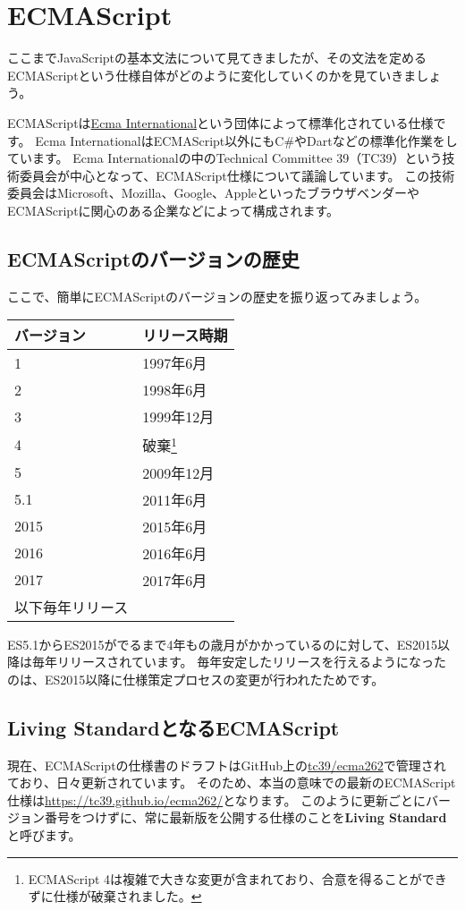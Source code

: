 \hypertarget{ecmascript}{%
\chapter{ECMAScript}\label{ecmascript}}

ここまでJavaScriptの基本文法について見てきましたが、その文法を定めるECMAScriptという仕様自体がどのように変化していくのかを見ていきましょう。

ECMAScriptは\href{http://www.ecma-international.org/}{Ecma
International}という団体によって標準化されている仕様です。 Ecma
InternationalはECMAScript以外にもC\#やDartなどの標準化作業をしています。
Ecma Internationalの中のTechnical Committee
39（TC39）という技術委員会が中心となって、ECMAScript仕様について議論しています。
この技術委員会はMicrosoft、Mozilla、Google、AppleといったブラウザベンダーやECMAScriptに関心のある企業などによって構成されます。

\hypertarget{history}{%
\section{ECMAScriptのバージョンの歴史}\label{history}}

ここで、簡単にECMAScriptのバージョンの歴史を振り返ってみましょう。

\begin{longtable}[]{@{}ll@{}}
\toprule
バージョン & リリース時期\tabularnewline
\midrule
\endhead
1 & 1997年6月\tabularnewline
2 & 1998年6月\tabularnewline
3 & 1999年12月\tabularnewline
4 & 破棄\footnote{ECMAScript
  4は複雑で大きな変更が含まれており、合意を得ることができずに仕様が破棄されました。}\tabularnewline
5 & 2009年12月\tabularnewline
5.1 & 2011年6月\tabularnewline
2015 & 2015年6月\tabularnewline
2016 & 2016年6月\tabularnewline
2017 & 2017年6月\tabularnewline
以下毎年リリース &\tabularnewline
\bottomrule
\end{longtable}

ES5.1からES2015がでるまで4年もの歳月がかかっているのに対して、ES2015以降は毎年リリースされています。
毎年安定したリリースを行えるようになったのは、ES2015以降に仕様策定プロセスの変更が行われたためです。

\hypertarget{living-standard}{%
\section{Living StandardとなるECMAScript}\label{living-standard}}

現在、ECMAScriptの仕様書のドラフトはGitHub上の\href{https://github.com/tc39/ecma262}{tc39/ecma262}で管理されており、日々更新されています。
そのため、本当の意味での最新のECMAScript仕様は\url{https://tc39.github.io/ecma262/}となります。
このように更新ごとにバージョン番号をつけずに、常に最新版を公開する仕様のことを\textbf{Living
Standard}と呼びます。

